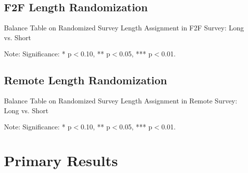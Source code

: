 \documentclass[11pt,harvard]{article}
\begin{document}
	\subsection{F2F Length Randomization}
	
	\begin{table}[htbp]
		\centering
		\begin{adjustbox}{max width=\textwidth}
			\begin{threeparttable}
				\caption{Balance Table on Randomized Survey Length Assignment in F2F Survey: Long vs. Short}
				\scriptsize
				 
				\label{tab:Ecuador_Demo_F2F_Length_Balance}
				\begin{tablenotes}
					\item Note: Significance: * p$<$0.10, ** p$<$0.05, *** p$<$0.01. 
				\end{tablenotes}
			\end{threeparttable}
		\end{adjustbox}
	\end{table}
	
	\pagebreak
	
	\subsection{Remote Length Randomization}
	\begin{table}[htbp]
		\centering
		\begin{adjustbox}{max width=\textwidth}
			\begin{threeparttable}
				\caption{Balance Table on Randomized Survey Length Assignment in Remote Survey: Long vs. Short}
				\scriptsize
				 
				\label{tab:Ecuador_Demo_RM_Length_Balance}
				\begin{tablenotes}
					\item Note: Significance: * p$<$0.10, ** p$<$0.05, *** p$<$0.01. 
				\end{tablenotes}
			\end{threeparttable}
		\end{adjustbox}
	\end{table}
	
	\pagebreak
	
	\section{Primary Results}
\end{document}
